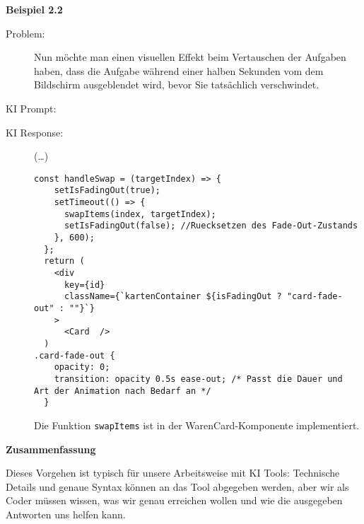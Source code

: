 \textbf{Beispiel 2.2} 
\begin{description}
    \item[Problem:] 
Nun möchte man einen visuellen Effekt beim Vertauschen der Aufgaben haben, dass die Aufgabe während einer halben Sekunden vom dem Bildschirm ausgeblendet wird, bevor Sie tatsächlich verschwindet. 
\item[KI Prompt:] \emph{ }

\item[KI Response:] (\ldots)
\begin{lstlisting}
const handleSwap = (targetIndex) => {
    setIsFadingOut(true);
    setTimeout(() => {
      swapItems(index, targetIndex);
      setIsFadingOut(false); //Ruecksetzen des Fade-Out-Zustands
    }, 600);
  };
  return (
    <div
      key={id}
      className={`kartenContainer ${isFadingOut ? "card-fade-out" : ""}`}
    >
      <Card  />
  )
.card-fade-out {
    opacity: 0;
    transition: opacity 0.5s ease-out; /* Passt die Dauer und Art der Animation nach Bedarf an */
  }

\end{lstlisting}

Die Funktion \texttt{swapItems} ist in der WarenCard-Komponente implementiert.
\end{description}

\textbf{Zusammenfassung}

Dieses Vorgehen ist typisch für unsere Arbeitsweise mit KI Tools: Technische Details und genaue Syntax können an das Tool abgegeben werden, aber wir als Coder müssen wissen, was wir genau erreichen wollen und wie die ausgegeben Antworten uns helfen kann. 